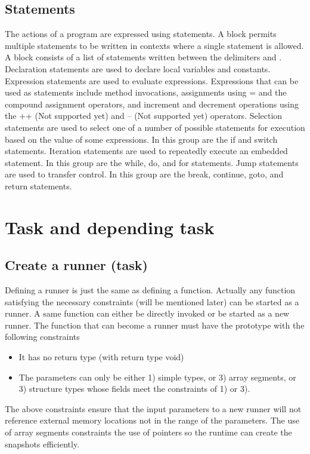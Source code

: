 \documentclass[a4paper]{article}
\begin{document}
\subsection{Statements}
The actions of a program are expressed using statements. 
A block permits multiple statements to be written in contexts where a single statement is allowed. A block consists of a list of statements written between the delimiters { and }.
Declaration statements are used to declare local variables and constants.
Expression statements are used to evaluate expressions. Expressions that can be used as statements include method invocations, assignments using = and the compound assignment operators, and increment and decrement operations using the ++ (Not supported yet) and -- (Not supported yet) operators.
Selection statements are used to select one of a number of possible statements for execution based on the value of some expressions. In this group are the if and switch statements.
Iteration statements are used to repeatedly execute an embedded statement. In this group are the while, do, and for statements.
Jump statements are used to transfer control. In this group are the break, continue, goto, and return statements.


\section{Task and depending task}

\subsection{Create a runner (task)}

Defining a runner is just the same as defining a function. Actually any function satisfying the necessary constraints (will be mentioned later) can be started as a runner. A same function can either be directly invoked or be started as a new runner.
The function that can become a runner must have the prototype with the following constraints

\begin{itemize}
	\item It has no return type (with return type void)
	\item The parameters can only be either 1) simple types, or 3) array segments, or 3) structure types whose fields meet the constraints of 1) or 3).
\end{itemize}

The above constraints ensure that the input parameters to a new runner will not reference external memory locations not in the range of the parameters. The use of array segments constraints the use of pointers so the runtime can create the snapshots efficiently.
\end{document}
